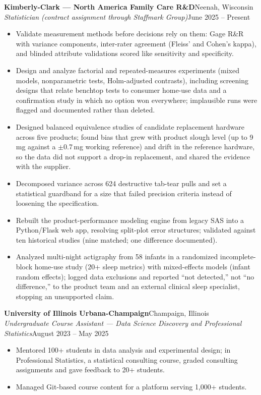 \documentclass[letterpaper,10pt]{article}
\newcommand{\role}[4]{
    \Needspace{5\baselineskip}
    \vspace{1pt}
    \textbf{#1}\hfill #2\\
    \textit{#3}\hfill #4\\[-3pt]
}
\begin{document}
\role{Kimberly-Clark --- North America Family Care R\&D}{Neenah, Wisconsin}
{Statistician (contract assignment through Staffmark Group)}{June 2025 -- Present}
\begin{itemize}
  \item Validate measurement methods before decisions rely on them: Gage R\&R with variance components, inter-rater agreement (Fleiss' and Cohen's kappa), and blinded attribute validations scored like sensitivity and specificity.
  \item Design and analyze factorial and repeated-measures experiments (mixed models, nonparametric tests, Holm-adjusted contrasts), including screening designs that relate benchtop tests to consumer home-use data and a confirmation study in which no option won everywhere; implausible runs were flagged and documented rather than deleted.
  \item Designed balanced equivalence studies of candidate replacement hardware across five products; found bias that grew with product slough level (up to 9\,mg against a $\pm$0.7\,mg working reference) and drift in the reference hardware, so the data did not support a drop-in replacement, and shared the evidence with the supplier.
  \item Decomposed variance across 624 destructive tab-tear pulls and set a statistical guardband for a size that failed precision criteria instead of loosening the specification.
  \item Rebuilt the product-performance modeling engine from legacy SAS into a Python/Flask web app, resolving split-plot error structures; validated against ten historical studies (nine matched; one difference documented).
  \item Analyzed multi-night actigraphy from 58 infants in a randomized incomplete-block home-use study (20+ sleep metrics) with mixed-effects models (infant random effects); logged data exclusions and reported ``not detected,'' not ``no difference,'' to the product team and an external clinical sleep specialist, stopping an unsupported claim.
\end{itemize}

\role{University of Illinois Urbana-Champaign}{Champaign, Illinois}
{Undergraduate Course Assistant --- Data Science Discovery and Professional Statistics}{August 2023 -- May 2025}
\begin{itemize}
  \item Mentored 100+ students in data analysis and experimental design; in Professional Statistics, a statistical consulting course, graded consulting assignments and gave feedback to 20+ students.
  \item Managed Git-based course content for a platform serving 1,000+ students.
\end{itemize}
\end{document}
